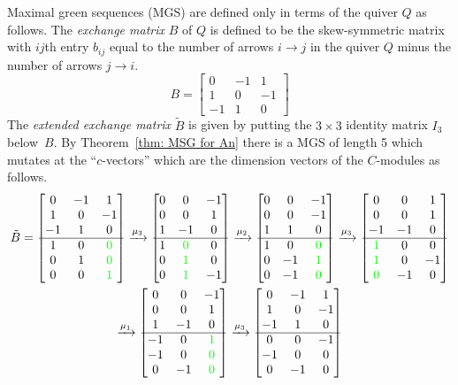 \documentclass[ALCO,ThmDefs,Unicode,epreuves]{cedram}
\newcommand{\mat}[1]{\ensuremath{
\left[\begin{matrix}#1
\end{matrix}\right]
}}
\begin{document}
Maximal green sequences (MGS) are defined only in terms of the quiver $Q$ as follows. The \emph{exchange matrix} $B$ of $Q$ is defined to be the skew-symmetric matrix with $ij$th entry $b_{ij}$ equal to the number of arrows $i\to j$ in the quiver $Q$ minus the number of arrows $j\to i$. %
\[
	B=\mat{0 & -1 & 1\\
	1 & 0 & -1\\
	-1 & 1 & 0}
\]
The \emph{extended exchange matrix} $\tilde B$ is given by putting the $3\times 3$ identity matrix $I_3$ below~$B$. By Theorem~\ref{thm: MSG for An} there is a MGS of length 5 which mutates at the \hbox{``$c$-vectors''} which are the dimension vectors of the $C$-modules as follows.
\begin{gather*}
	\tilde B=\mat{0 & -1 & 1\\
	1 & 0 & -1\\
	-1 & 1 & 0\\
	\hline %
	1 & 0 & \color{green}0\\
	0 & 1 & \color{green}0\\
	0 & 0 & \color{green}1} 
	\xrightarrow{\mu_3}
	 \mat{0 & 0 & -1\\
	0 & 0 & 1\\
	1 & -1 & 0\\
	\hline %
	1 & \color{green}0 & 0\\
	0 & \color{green}1 & 0\\
	0 & \color{green}1 & -1} 
	\xrightarrow{\mu_2} 
	 \mat{0 & 0 & -1\\
	0 & 0 & -1\\
	1 & 1 & 0\\
	\hline %
	1 & 0 & \color{green}0\\
	0 & -1 & \color{green}1\\
	0 & -1 & \color{green}0} 
	\xrightarrow{\mu_3} 
	\mat{0 & 0 & 1\\
	0 & 0 & 1\\
	-1 & -1 & 0\\
	\hline %
	\color{green}1 & 0 & 0\\
	\color{green}1 & 0 & -1\\
	\color{green}0 & -1 & 0} 
\\
	\xrightarrow{\mu_1} 
	\mat{0 & 0 & -1\\
	0 & 0 & 1\\
	1 & -1 & 0\\
	\hline %
	-1 & 0 & \color{green}1\\
	-1 & 0 & \color{green}0\\
	0 & -1 & \color{green}0}	
	\xrightarrow{\mu_3} 
	\mat{0 & -1 & 1\\
	1 & 0 & -1\\
	-1 & 1 & 0\\
	\hline %
	0 & 0 & -1\\
	-1 & 0& 0\\
	0 & -1 & 0}
\end{gather*}
\end{document}
